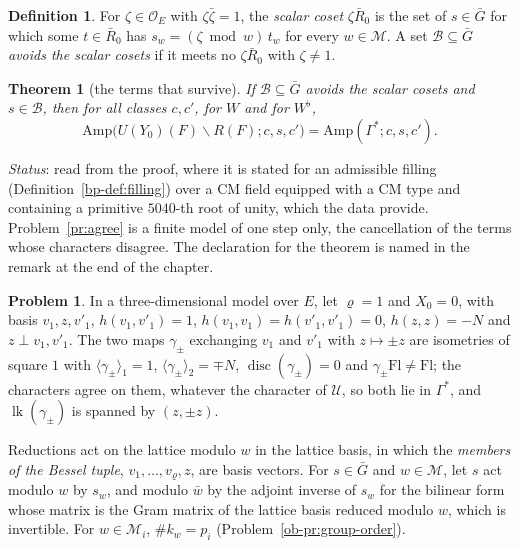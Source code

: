 \documentclass[reqno]{amsart}
\newcounter{chap}
\theoremstyle{definition}
\newtheorem{problem}{Problem}[section]
\newtheorem{definition}{Definition}[section]
\theoremstyle{plain}
\newtheorem{theorem}{Theorem}[section]
\theoremstyle{remark}
\newcommand{\Oc}{\mathcal O}
\newcommand{\Uc}{{\mathcal{U}}}
\newcommand{\Bc}{\mathcal B}
\newcommand{\cMc}{\mathcal M}
\newcommand{\Gb}{\bar G}
\newcommand{\Rb}{\bar R_0}
\newcommand{\Amp}{\mathrm{Amp}}
\newcommand{\disc}{\operatorname{disc}}
\newcommand{\lk}{\operatorname{lk}}
\newcommand{\Fl}{\mathrm{Fl}}
\begin{document}
\begin{definition}\label{def:scalar-coset}
For \(\zeta\in\Oc_E\) with \(\zeta\bar\zeta=1\), the \emph{scalar coset} \(\zeta\Rb\) is the set of \(s\in\Gb\) for which some \(t\in\Rb\) has \(s_w=(\zeta\bmod w)\,t_w\) for every \(w\in\cMc\).  A set \(\Bc\subseteq\Gb\) \emph{avoids the scalar cosets} if it meets no \(\zeta\Rb\) with \(\zeta\ne1\).
\end{definition}

\begin{theorem}[the terms that survive]\label{thm:survivors}
If \(\Bc\subseteq\Gb\) avoids the scalar cosets and \(s\in\Bc\), then for all classes \(c,c'\), for \(W\) and for \(W^\flat\),
\[
 \Amp\bigl(U(Y_0)(F)\smallsetminus R(F);c,s,c'\bigr)=\Amp(\Gamma^*;c,s,c').
\]
\end{theorem}

\noindent\emph{Status}: read from the proof, where it is stated for an admissible filling (Definition~\ref{bp-def:filling}) over a CM field equipped with a CM type and containing a primitive \(5040\)-th root of unity, which the data provide.  Problem~\ref{pr:agree} is a finite model of one step only, the cancellation of the terms whose characters disagree.  The declaration for the theorem is named in the remark at the end of the chapter.

\begin{problem}\label{pr:two-links}
In a three-dimensional model over \(E\), let \(\varrho=1\) and \(X_0=0\), with basis \(v_1,z,v'_1\), \(h(v_1,v'_1)=1\), \(h(v_1,v_1)=h(v'_1,v'_1)=0\), \(h(z,z)=-N\) and \(z\perp v_1,v'_1\).  The two maps \(\gamma_\pm\) exchanging \(v_1\) and \(v'_1\) with \(z\mapsto\pm z\) are isometries of square \(1\) with \(\langle\gamma_\pm\rangle_1=1\), \(\langle\gamma_\pm\rangle_2=\mp N\), \(\disc(\gamma_\pm)=0\) and \(\gamma_\pm\Fl\ne\Fl\); the characters agree on them, whatever the character of \(\Uc\), so both lie in \(\Gamma^*\), and \(\lk(\gamma_\pm)\) is spanned by \((z,\pm z)\).
\end{problem}

Reductions act on the lattice modulo \(w\) in the lattice basis, in which the \emph{members of the Bessel tuple}, \(v_1,\dots,v_\varrho,z\), are basis vectors.  For \(s\in\Gb\) and \(w\in\cMc\), let \(s\) act modulo \(w\) by \(s_w\), and modulo \(\bar w\) by the adjoint inverse of \(s_w\) for the bilinear form whose matrix is the Gram matrix of the lattice basis reduced modulo \(w\), which is invertible.  For \(w\in\cMc_i\), \(\#k_w=p_i\) (Problem~\ref{ob-pr:group-order}).
\end{document}
